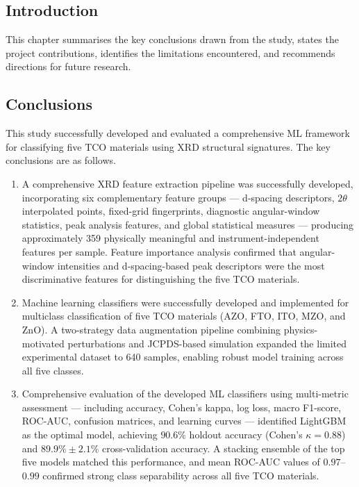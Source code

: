 \documentclass[12pt, oneside]{article} %
\begin{document}
\subsection{Introduction}

This chapter summarises the key conclusions drawn from the study, states the project contributions, identifies the limitations encountered, and recommends directions for future research.


\subsection{Conclusions}

This study successfully developed and evaluated a comprehensive ML framework for classifying five TCO materials using XRD structural signatures. The key conclusions are as follows.

\begin{enumerate}[itemsep=0mm]
\item A comprehensive XRD feature extraction pipeline was successfully developed, incorporating six complementary feature groups --- d-spacing descriptors, $2\theta$ interpolated points, fixed-grid fingerprints, diagnostic angular-window statistics, peak analysis features, and global statistical measures --- producing approximately 359 physically meaningful and instrument-independent features per sample. Feature importance analysis confirmed that angular-window intensities and d-spacing-based peak descriptors were the most discriminative features for distinguishing the five TCO materials.

\item Machine learning classifiers were successfully developed and implemented for multiclass classification of five TCO materials (AZO, FTO, ITO, MZO, and ZnO). A two-strategy data augmentation pipeline combining physics-motivated perturbations and JCPDS-based simulation expanded the limited experimental dataset to 640 samples, enabling robust model training across all five classes.

\item Comprehensive evaluation of the developed ML classifiers using multi-metric assessment --- including accuracy, Cohen's kappa, log loss, macro F1-score, ROC-AUC, confusion matrices, and learning curves --- identified LightGBM as the optimal model, achieving $90.6\%$ holdout accuracy (Cohen's $\kappa = 0.88$) and $89.9\% \pm 2.1\%$ cross-validation accuracy. A stacking ensemble of the top five models matched this performance, and mean ROC-AUC values of $0.97$--$0.99$ confirmed strong class separability across all five TCO materials.
\end{enumerate}
\end{document}
